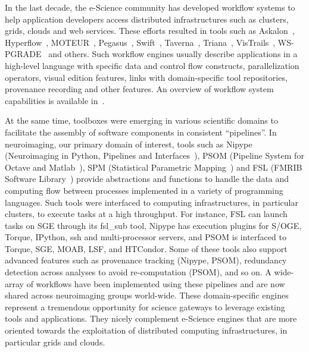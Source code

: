 \documentclass[preprint,3p,twocolumn]{elsarticle}
\newcommand{\note}[2]{\pdfmargincomment[color=yellow,author=#1,open=true]{#2}}
\newcommand{\closednote}[4]{} %
\begin{document}
In the last decade, the e-Science community has developed workflow
systems to help application developers access distributed
infrastructures such as clusters, grids, clouds and web
services. These efforts resulted in tools such as
Askalon~\cite{fahringer2005askalon},
Hyperflow~\cite{balis2016hyperflow}, MOTEUR~\cite{GLAT-08i},
Pegasus~\cite{deelman2005pegasus,Deelman201517},
Swift~\cite{zhao2007swift}, Taverna~\cite{oinn2004taverna},
Triana~\cite{taylor2007triana}, VisTrails~\cite{callahan2006managing},
WS-PGRADE~\cite{Kacsuk2012} and others. Such workflow engines usually
describe applications in a high-level language with specific data and
control flow constructs, parallelization operators, visual edition
features, links with domain-specific tool repositories, provenance
recording and other features. An overview of workflow system
capabilities is available in~\cite{deelman2009workflows}.

At the same time, toolboxes were emerging in various scientific
domains to facilitate the assembly of software components in
consistent ``pipelines''. In neuroimaging, our primary domain of
interest, tools such as Nipype (Neuroimaging in Python, Pipelines and
Interfaces~\cite{gorgolewski2011nipype}), PSOM (Pipeline System for
Octave and Matlab~\cite{bellec2012pipeline}), SPM (Statistical
Parametric Mapping~\cite{ashburner2011spm}) and FSL (FMRIB Software
Library~\cite{Jenkinson2012782}) provide abstractions and functions to
handle the data and computing flow between processes implemented in a
variety of programming languages. Such tools were interfaced to
computing infrastructures, in particular clusters\closednote{Tristan}{Reverted from Marc's 'cluster scheduler'}{}{}, to execute tasks at
a high throughput. For instance, FSL can launch tasks on SGE through
its fsl\_sub tool, Nipype has execution plugins for S/OGE, Torque,
IPython, ssh and multi-processor servers, and PSOM is interfaced to
Torque, SGE, MOAB, LSF, and HTCondor. Some of these tools also support
advanced features such as provenance tracking (Nipype, PSOM),
redundancy detection across analyses to avoid re-computation (PSOM),
and so on. A wide-array of workflows have been implemented using these
pipelines and are now shared across neuroimaging groups
world-wide. These domain-specific engines represent a tremendous
opportunity for science gateways to leverage existing tools and
applications. They nicely complement e-Science engines that are more
oriented towards the exploitation of distributed computing
infrastructures, in particular grids and clouds.
\end{document}
